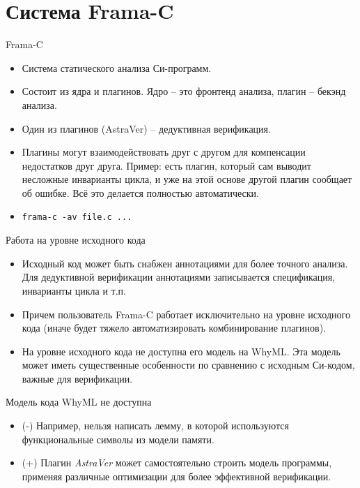 \documentclass[hyperref={unicode=true}]{beamer}
\begin{document}
    \section{Система Frama-C}

    \begin{frame}{Frama-C}
    \begin{itemize}
    \item Система статического анализа Си-программ.
    \item Состоит из ядра и плагинов. Ядро -- это фронтенд
    анализа, плагин -- бекэнд анализа.
    \item Один из плагинов (AstraVer) -- дедуктивная верификация.
    \item Плагины могут взаимодействовать друг с другом
    для компенсации недостатков друг друга. Пример:
    есть плагин, который сам выводит несложные инварианты цикла,
    и уже на этой основе другой плагин сообщает об ошибке.
    Всё это делается полностью автоматически.
    \item \texttt{frama-c -av file.c ...}
    \end{itemize}
    \end{frame}

    \begin{frame}{Работа на уровне исходного кода}
    \begin{itemize}
    \item Исходный код может быть снабжен аннотациями
    для более точного анализа. Для дедуктивной верификации
    аннотациями записывается спецификация, инварианты цикла
    и т.п.
    \item Причем пользователь Frama-C работает
    исключительно на уровне исходного кода (иначе будет тяжело
    автоматизировать комбинирование плагинов).
    \item На уровне исходного кода не доступна его модель на WhyML.
    Эта модель может иметь существенные особенности по сравнению
    с исходным Си-кодом, важные для верификации.
    \end{itemize}
    \end{frame}

    \begin{frame}{Модель кода WhyML не доступна}
    \begin{itemize}
    \item (-) Например, нельзя написать лемму, в которой
    используются функциональные символы из модели памяти.
    \item (+) Плагин \textsl{AstraVer} может самостоятельно
    строить модель программы, применяя различные
    оптимизации для более эффективной верификации.
    \end{itemize}
    \end{frame}
\end{document}
